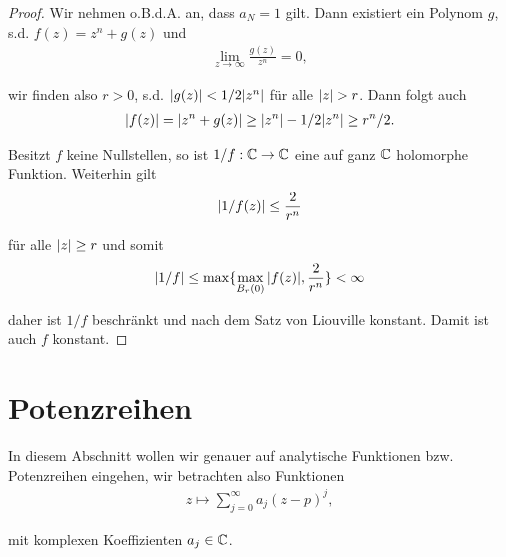 \begin{proof}
 Wir nehmen o.B.d.A. an, dass \(a_N=1\) gilt. Dann existiert ein Polynom \(g\), s.d. \(f(z) = z^n + g(z)\) und
\begin{align*}
\lim_{z\to\infty} \frac{g(z)}{z^n} = 0,
\end{align*}
\par
wir finden also \(r>0\), s.d. \(\vert g(z) \vert < 1/2 \vert z^n \vert\) für alle \(\vert z \vert>r\). Dann folgt auch
\begin{align*}
\vert f(z) \vert = \vert z^n + g(z) \vert \geq \vert z^n \vert - 1/2 \vert z^n \vert\geq r^n/2.
\end{align*}
\par
Besitzt \(f\) keine Nullstellen, so ist \(1/f:\mathbb{C}\to\mathbb{C}\) eine auf ganz \(\mathbb{C}\) holomorphe Funktion. Weiterhin gilt
\begin{align*}
\vert 1/f(z) \vert \leq \frac{2}{r^n}
\end{align*}
\par
für alle \(\vert z \vert\geq r\) und somit
\begin{align*}
\vert 1/f \vert \leq \max\{\max_{B_r(0)} \vert f(z) \vert, \frac{2}{r^n} \} < \infty
\end{align*}
\par
daher ist \(1/f\) beschränkt und nach dem Satz von Liouville konstant. Damit ist auch \(f\) konstant.
\end{proof}


\section{Potenzreihen}
\label{\detokenize{complexanalysis/powerseries:potenzreihen}}\label{\detokenize{complexanalysis/powerseries::doc}}
\par
In diesem Abschnitt wollen wir genauer auf analytische Funktionen bzw. Potenzreihen eingehen, wir betrachten also Funktionen
\begin{align*}
z\mapsto \sum_{j=0}^{\infty} a_j (z-p)^j,
\end{align*}
\par
mit komplexen Koeffizienten \(a_j\in\mathbb{C}\).


